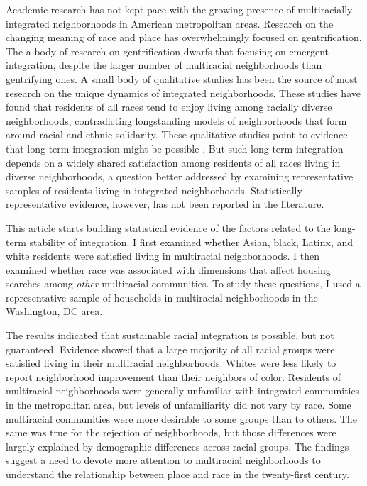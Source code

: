 \documentclass{baderart}
\begin{document}
Academic research has not kept pace with the growing presence of multiracially integrated neighborhoods in American metropolitan areas. Research on the changing meaning of race and place has overwhelmingly focused on gentrification. The a body of research on gentrification dwarfs that focusing on emergent integration, despite the larger number of multiracial neighborhoods than gentrifying ones. A small body of qualitative studies has been the source of most research on the unique dynamics of integrated neighborhoods. These studies have found that residents of all races tend to enjoy living among racially diverse neighborhoods, contradicting longstanding models of neighborhoods that form around racial and ethnic solidarity. These qualitative studies point to evidence that long-term integration might be possible \citep{maly_beyond_2005, spitz_segregated_2015, lumleysapanski_planning_2017}. But such long-term integration depends on a widely shared satisfaction among residents of all races living in diverse neighborhoods, a question better addressed by examining representative samples of residents living in integrated neighborhoods. Statistically representative evidence, however, has not been reported in the literature. 

This article starts building statistical evidence of the factors related to the long-term stability of integration. I first examined whether Asian, black, Latinx, and white residents were satisfied living in multiracial neighborhoods. I then examined whether race was associated with dimensions that affect housing searches among \emph{other} multiracial communities. To study these questions, I used a representative sample of households in multiracial neighborhoods in the Washington, DC area. 

The results indicated that sustainable racial integration is possible, but not guaranteed. Evidence showed that a large majority of all racial groups were satisfied living in their multiracial neighborhoods. Whites were less likely to report neighborhood improvement than their neighbors of color. Residents of multiracial neighborhoods were generally unfamiliar with integrated communities in the metropolitan area, but levels of unfamiliarity did not vary by race. Some multiracial communities were more desirable to some groups than to others. The same was true for the rejection of neighborhoods, but those differences were largely explained by demographic differences across racial groups. The findings suggest a need to devote more attention to multiracial neighborhoods to understand the relationship between place and race in the twenty-first century. 
\end{document}
